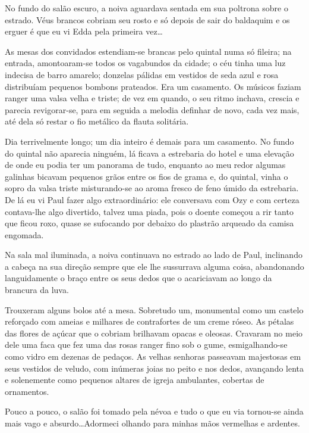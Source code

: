 No fundo do salão escuro, a noiva aguardava sentada em sua poltrona sobre o estrado. Véus brancos cobriam seu rosto e só depois de sair do baldaquim e os erguer é que eu vi Edda pela primeira vez\dots

As mesas dos convidados estendiam-se brancas pelo quintal numa só fileira; na entrada, amontoaram-se todos os vagabundos da cidade; o céu tinha uma luz indecisa de barro amarelo; donzelas pálidas em vestidos de seda azul e rosa distribuíam pequenos bombons prateados. Era um casamento. Os músicos faziam ranger uma valsa velha e triste; de vez em quando, o seu ritmo inchava, crescia e parecia revigorar-se, para em seguida a melodia definhar de novo, cada vez mais, até dela só restar o fio metálico da flauta solitária.

Dia terrivelmente longo; um dia inteiro é demais para um casamento. No fundo do quintal não aparecia ninguém, lá ficava a estrebaria do hotel e uma elevação de onde eu podia ter um panorama de tudo, enquanto ao meu redor algumas galinhas bicavam pequenos grãos entre os fios de grama e, do quintal, vinha o sopro da valsa triste misturando-se ao aroma fresco de feno úmido da estrebaria. De lá eu vi Paul fazer algo extraordinário: ele conversava com Ozy e com certeza contava-lhe algo divertido, talvez uma piada, pois o doente começou a rir tanto que ficou roxo, quase se sufocando por debaixo do plastrão arqueado da camisa engomada.


Na sala mal iluminada, a noiva continuava no estrado ao lado de Paul, inclinando a cabeça na sua direção sempre que ele lhe sussurrava alguma coisa, abandonando languidamente o braço entre os seus dedos que o acariciavam ao longo da brancura da luva.

Trouxeram alguns bolos até a mesa. Sobretudo um, monumental como um castelo reforçado com ameias e milhares de contrafortes de um creme róseo. As pétalas das flores de açúcar que o cobriam brilhavam opacas e oleosas. Cravaram no meio dele uma faca que fez uma das rosas ranger fino sob o gume, esmigalhando-se como vidro em dezenas de pedaços. As velhas senhoras passeavam majestosas em seus vestidos de veludo, com inúmeras joias no peito e nos dedos, avançando lenta e solenemente como pequenos altares de igreja ambulantes, cobertas de ornamentos.

Pouco a pouco, o salão foi tomado pela névoa e tudo o que eu via tornou-se ainda mais vago e absurdo\dots Adormeci olhando para minhas mãos vermelhas e ardentes.


